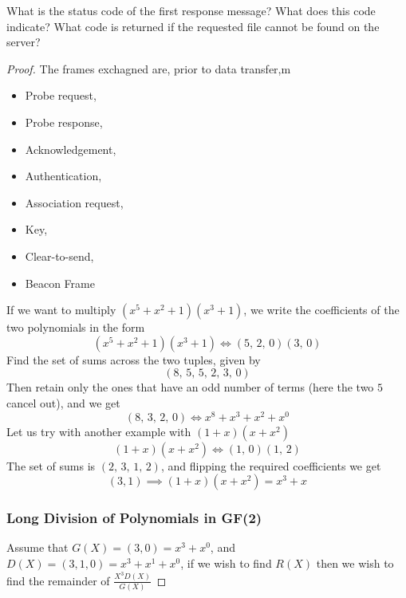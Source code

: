 \documentclass[../../main.tex]{subfiles}
\begin{document}
\begin{wts}
What is the status code of the first response message? What does this code indicate? What code is returned if the requested file cannot be found on the server?
\end{wts}
\begin{proof}
The frames exchagned are, prior to data transfer,m
    \begin{itemize}
        \item Probe request,
        \item Probe response,
        \item Acknowledgement,
        \item Authentication,
        \item Association request,
        \item Key,
        \item Clear-to-send,
        \item Beacon Frame
    \end{itemize}
    If we want to multiply $(x^5 + x^2 + 1)(x^3+1)$, we write the coefficients of the two polynomials in the form
\[
(x^5 + x^2 + 1)(x^3+1)\iff (5,\,2,\,0)(3,\,0)
\]
Find the set of sums across the two tuples, given by
\[
(8,\,5,\,5,\,2,\,3,\,0)
\]
Then retain only the ones that have an odd number of terms (here the two $5$ cancel out), and we get
\[
(8,\,3,\,2,\,0)\iff x^8 + x^3 + x^2 + x^0
\]
Let us try with another example with $(1+x)(x+x^2)$
\[
(1+x)(x+x^2)\iff (1,\,0)(1,\,2)
\]
The set of sums is $(2,\,3,\,1,\,2)$, and flipping the required coefficients we get
\[
(3,1)\implies (1+x)(x+x^2) = x^3 + x
\]
\subsubsection*{Long Division of Polynomials in GF(2)}
Assume that $G(X) = (3,0) = x^3 + x^0$, and $D(X) = (3,1,0) = x^3 + x^1 + x^0$, if we wish to find $R(X)$ then we wish to find the remainder of $\frac{X^{3}D(X)}{G(X)}$
\end{proof}
\end{document}
